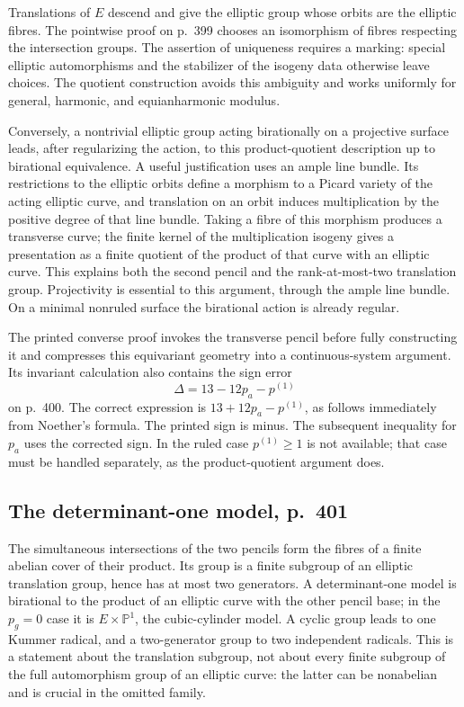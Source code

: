 Translations of $E$ descend and give the elliptic group whose orbits are the elliptic fibres. The pointwise proof on p.~399 chooses an isomorphism of fibres respecting the intersection groups. The assertion of uniqueness requires a marking: special elliptic automorphisms and the stabilizer of the isogeny data otherwise leave choices. The quotient construction avoids this ambiguity and works uniformly for general, harmonic, and equianharmonic modulus.

Conversely, a nontrivial elliptic group acting birationally on a projective surface leads, after regularizing the action, to this product-quotient description up to birational equivalence. A useful justification uses an ample line bundle. Its restrictions to the elliptic orbits define a morphism to a Picard variety of the acting elliptic curve, and translation on an orbit induces multiplication by the positive degree of that line bundle. Taking a fibre of this morphism produces a transverse curve; the finite kernel of the multiplication isogeny gives a presentation as a finite quotient of the product of that curve with an elliptic curve. This explains both the second pencil and the rank-at-most-two translation group. Projectivity is essential to this argument, through the ample line bundle. On a minimal nonruled surface the birational action is already regular.

The printed converse proof invokes the transverse pencil before fully constructing it and compresses this equivariant geometry into a continuous-system argument. Its invariant calculation also contains the sign error
\[
 \Delta=13-12p_a-p^{(1)}
\]
on p.~400. The correct expression is $13+12p_a-p^{(1)}$, as follows immediately from Noether's formula. The printed sign is minus. The subsequent inequality for $p_a$ uses the corrected sign. In the ruled case $p^{(1)}\geq1$ is not available; that case must be handled separately, as the product-quotient argument does.

\subsection{The determinant-one model, p.~401}

The simultaneous intersections of the two pencils form the fibres of a finite abelian cover of their product. Its group is a finite subgroup of an elliptic translation group, hence has at most two generators. A determinant-one model is birational to the product of an elliptic curve with the other pencil base; in the $p_g=0$ case it is $E\times\mathbb P^1$, the cubic-cylinder model. A cyclic group leads to one Kummer radical, and a two-generator group to two independent radicals. This is a statement about the translation subgroup, not about every finite subgroup of the full automorphism group of an elliptic curve: the latter can be nonabelian and is crucial in the omitted family.

